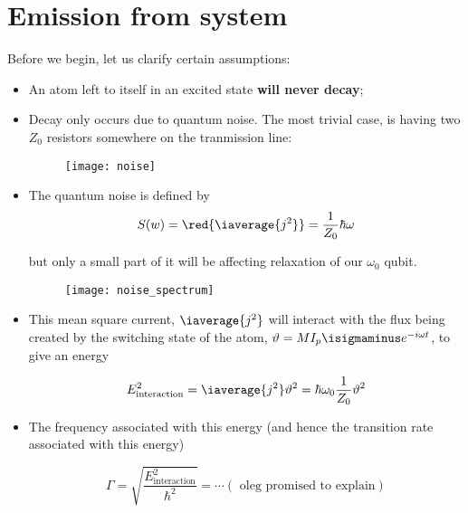 
\section{Emission from system}
Before we begin, let us clarify certain assumptions:
\begin{itemize}
\item An  atom left  to itself  in an  excited state  \textbf{will never
    decay};
\item Decay only occurs due to  quantum noise. The most trivial case, is
  having two $ Z_0 $ resistors somewhere on the tranmission line:

\begin{figure}[h]
  \centering \texttt{[image: noise]}
\end{figure}

\noindent

\item The quantum  noise \textbf{} is defined by
  \begin{equation}\label{key}
    S(w) = \red{\iaverage{j^2}} = \frac{1}{Z_0}\hbar\omega
  \end{equation}

  \noindent but only a small part  of it will be affecting relaxation of
  our $ \omega_0 $ qubit.

\begin{figure}[h]
  \centering \texttt{[image: noise\_spectrum]}
\end{figure}

\noindent

\item This  mean square current,  $ \iaverage{j^2} $ will  interact with
  the  flux  being   created  by  the  switching  state   of  the  atom,
  $ \vartheta = MI_p\isigmaminus e^{-i\omega t} $, to give an energy

  \begin{equation}\label{key}
    E_\text{interaction}^2 = \iaverage{j^2}\vartheta^2 = \hbar\omega_0\frac{1}{Z_0}\vartheta^2
  \end{equation}

\item  The  frequency  associated  with   this  energy  (and  hence  the
  transition rate associated with this energy)

  \begin{equation}\label{key}
    \Gamma = \sqrt{\frac{E_\text{interaction}^2}{\hbar^2}} = \cdots (\text{ oleg promised to explain})
  \end{equation}
\end{itemize}

